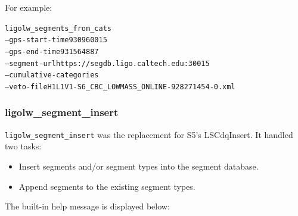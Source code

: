 For example:
\begin{alltt}
ligolw\_segments\_from\_cats
  --gps-start-time 930960015
  --gps-end-time 931564887
  --segment-url https://segdb.ligo.caltech.edu:30015
  --cumulative-categories
  --veto-file H1L1V1-S6\_CBC\_LOWMASS\_ONLINE-928271454-0.xml
\end{alltt}




\subsubsection{ligolw\_segment\_insert}

\texttt{ligolw\_segment\_insert} was the replacement for S5's 
LSCdqInsert.   It handled two tasks:

\begin{itemize}
\item Insert segments and/or segment types into the segment database.
\item Append segments to the existing segment types.
\end{itemize}

The built-in help message is displayed below:

